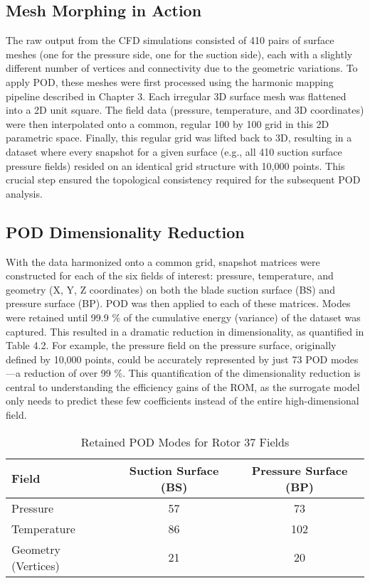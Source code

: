 \documentclass[dscexam, EN]{ufabcFHZh}
\begin{document}
\subsection{Mesh Morphing in Action}

The raw output from the CFD simulations consisted of 410 pairs of surface meshes (one for the pressure side, one for the suction side), each with a slightly different number of vertices and connectivity due to the geometric variations. To apply POD, these meshes were first processed using the harmonic mapping pipeline described in Chapter 3. Each irregular 3D surface mesh was flattened into a 2D unit square. The field data (pressure, temperature, and 3D coordinates) were then interpolated onto a common, regular 100 by 100 grid in this 2D parametric space. Finally, this regular grid was lifted back to 3D, resulting in a dataset where every snapshot for a given surface (e.g., all 410 suction surface pressure fields) resided on an identical grid structure with 10,000 points. This crucial step ensured the topological consistency required for the subsequent POD analysis.  

\subsection{ POD Dimensionality Reduction}

With the data harmonized onto a common grid, snapshot matrices were constructed for each of the six fields of interest: pressure, temperature, and geometry (X, Y, Z coordinates) on both the blade suction surface (BS) and pressure surface (BP). POD was then applied to each of these matrices. Modes were retained until 99.9 \% of the cumulative energy (variance) of the dataset was captured. This resulted in a dramatic reduction in dimensionality, as quantified in Table 4.2. For example, the pressure field on the pressure surface, originally defined by 10,000 points, could be accurately represented by just 73 POD modes—a reduction of over 99 \%. This quantification of the dimensionality reduction is central to understanding the efficiency gains of the ROM, as the surrogate model only needs to predict these few coefficients instead of the entire high-dimensional field.

\begin{table}[htbp]
  \centering
  \caption{Retained POD Modes for Rotor 37 Fields}
  \label{tab:retained_pod_modes}
  \begin{tabular}{|l|c|c|}
    \hline
    \textbf{Field} & \textbf{Suction Surface (BS)} & \textbf{Pressure Surface (BP)} \\
    \hline
    Pressure & 57 & 73 \\
    Temperature & 86 & 102 \\
    Geometry (Vertices) & 21 & 20 \\
    \hline
  \end{tabular}
\end{table}
\end{document}
